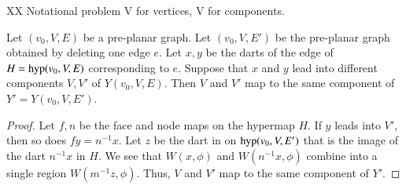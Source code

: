 %
%

XX Notational problem V for vertices, V for components.

\begin{lemma} 
Let $(v_0,V,E)$ be a pre-planar graph.  Let $(v_0,V,E')$
be the pre-planar graph obtained by deleting one edge $e$.
Let $x,y$ be the darts of the edge of
$H={\operatorname{hyp}}(v_0,V,E)$ corresponding
to $e$.  
Suppose that $x$ and $y$ lead into different components $V,V'$
of $Y(v_0,V,E)$.
Then $V$ and $V'$ map to the same component of $Y'=Y(v_0,V,E')$.
\end{lemma}

\begin{proof}
Let $f,n$ be the face and node maps on the hypermap
$H$.
If $y$ leads into $V'$, then so does
$f y = n^{-1} x$.  Let $z$ be the dart in
on ${\operatorname{hyp}}(v_0,V,E')$ that is the image of the dart $n^{-1}x$
in $H$. We see that
$W(x,\phi)$ and $W(n^{-1} x,\phi)$ combine into a single
region $W(m^{-1}z,\phi)$.  Thus, $V$ and $V'$ map to the
same component of $Y'$.
\end{proof}

%


